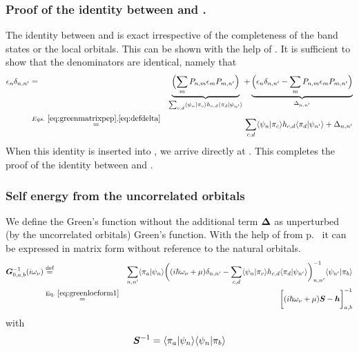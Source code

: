 \documentclass[11pt,a4paper]{report}
\begin{document}
\subsubsection{Proof of the identity between 
and .}
The identity between  and  is
exact irrespective of the completeness of the band states or the local
orbitals. This can be shown with the help of . It is sufficient to show that the denominators are identical,
namely that
\begin{eqnarray}
\epsilon_n\delta_{n,n'}
&=&\underbrace{\Bigl(\sum_{m}P_{n,m}\epsilon_{m}P_{m,n'}\Bigr)}
_{\sum_{c,d}\langle\psi_n|\pi_c\rangle h_{c,d}
\langle\pi_d|\psi_{n'}\rangle}
+\underbrace{
\Bigl(\epsilon_n\delta_{n,n'}-\sum_{m}P_{n,m}\epsilon_mP_{m,n'}\Bigr)
}_{\Delta_{n,n'}}
\nonumber\\
&\stackrel{Eqs.~\ref{eq:greenmatrixpep},\ref{eq:defdelta}}{=}&
\sum_{c,d}\langle\psi_n|\pi_c\rangle h_{c,d}
\langle\pi_d|\psi_{n'}\rangle+\Delta_{n,n'}
\nonumber
\end{eqnarray}
When this identity is inserted into , we arrive
directly at .  This completes the proof of the
identity between  and .

\subsubsection{Self energy from the uncorrelated orbitals}
We define the Green's function without the additional term
$\bm{\Delta}$ as unperturbed (by the uncorrelated orbitals) Green's
function.  With the help of  from
p.~\pageref{eq:greenlocform1} it can be expressed in matrix form
without reference to the natural orbitals.
\begin{eqnarray}
\mat{G}^{-1}_{0,a,b}(i\omega_\nu)&\defas&
\sum_{n,n'}\langle\pi_a|\psi_n\rangle
\biggl((i\hbar\omega_\nu+\mu)\delta_{n,n'}-
\sum_{c,d}\langle\psi_n|\pi_c\rangle h_{c,d}\langle\pi_d|\psi_{n'}\rangle
\biggr)^{-1}_{n,n'}
\langle\psi_{n'}|\pi_b\rangle
\nonumber\\
&\eqrel{eq:greenlocform1}{=}&
\biggl[(i\hbar\omega_\nu+\mu)\mat{S}-\mat{h}\biggr]^{-1}_{a,b}
\end{eqnarray}
with
\begin{eqnarray}
\bm{S}^{-1}=\langle\pi_a|\psi_n\rangle\langle\psi_n|\pi_b\rangle
\end{eqnarray}
\end{document}
